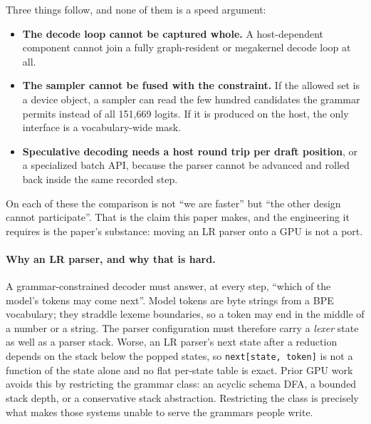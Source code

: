 \documentclass{article}
\begin{document}
Three things follow, and none of them is a speed argument:

\begin{itemize}
\item \textbf{The decode loop cannot be captured whole.} A host-dependent
component cannot join a fully graph-resident or megakernel decode loop at all.
\item \textbf{The sampler cannot be fused with the constraint.} If the allowed
set is a device object, a sampler can read the few hundred candidates the
grammar permits instead of all 151{,}669 logits. If it is produced on the host,
the only interface is a vocabulary-wide mask.
\item \textbf{Speculative decoding needs a host round trip per draft position},
or a specialized batch API, because the parser cannot be advanced and rolled
back inside the same recorded step.
\end{itemize}

On each of these the comparison is not ``we are faster'' but ``the other design
cannot participate''. That is the claim this paper makes, and the engineering it
requires is the paper's substance: moving an LR parser onto a GPU is not a port.

\paragraph{Why an LR parser, and why that is hard.} A grammar-constrained
decoder must answer, at every step, ``which of the model's tokens may come
next''. Model tokens are byte strings from a BPE vocabulary; they straddle
lexeme boundaries, so a token may end in the middle of a number or a string. The
parser configuration must therefore carry a \emph{lexer} state as well as a
parser stack. Worse, an LR parser's next state after a reduction depends on the
stack below the popped states, so \texttt{next[state, token]} is not a function
of the state alone and no flat per-state table is exact. Prior GPU work avoids
this by restricting the grammar class: an acyclic schema DFA, a bounded stack
depth, or a conservative stack abstraction. Restricting the class is precisely
what makes those systems unable to serve the grammars people write.
\end{document}
